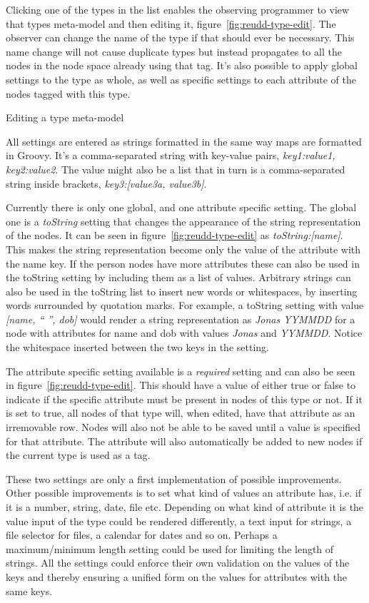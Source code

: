\documentclass[a4paper]{report}
\begin{document}
Clicking one of the types in the list enables the observing programmer to view that types meta-model and then editing it, figure~\ref{fig:reudd-type-edit}. The observer can change the name of the type if that should ever be necessary. This name change will not cause duplicate types but instead propagates to all the nodes in the node space already using that tag. It's also possible to apply global settings to the type as whole, as well as specific settings to each attribute of the nodes tagged with this type.

	{Editing a type meta-model}

All settings are entered as strings formatted in the same way maps are formatted in Groovy. It's a comma-separated string with key-value pairs, \emph{key1:value1, key2:value2}. The value might also be a list that in turn is a comma-separated string inside brackets, \emph{key3:[value3a, value3b]}.

Currently there is only one global, and one attribute specific setting. The global one is a \emph{toString} setting that changes the appearance of the string representation of the nodes. It can be seen in figure~\ref{fig:reudd-type-edit} as \emph{toString:[name]}. This makes the string representation become only the value of the attribute with the name key. If the person nodes have more attributes these can also be used in the toString setting by including them as a list of values. Arbitrary strings can also be used in the toString list to insert new words or whitespaces, by inserting words surrounded by quotation marks. For example, a toString setting with value \emph{[name, `` '', dob]} would render a string representation as \emph{Jonas YYMMDD} for a node with attributes for name and dob with values \emph{Jonas} and \emph{YYMMDD}. Notice the whitespace inserted between the two keys in the setting.

The attribute specific setting available is a \emph{required} setting and can also be seen in figure~\ref{fig:reudd-type-edit}. This should have a value of either true or false to indicate if the specific attribute must be present in nodes of this type or not. If it is set to true, all nodes of that type will, when edited, have that attribute as an irremovable row. Nodes will also not be able to be saved until a value is specified for that attribute. The attribute will also automatically be added to new nodes if the current type is used as a tag.

These two settings are only a first implementation of possible improvements. Other possible improvements is to set what kind of values an attribute has, i.e. if it is a number, string, date, file etc. Depending on what kind of attribute it is the value input of the type could be rendered differently, a text input for strings, a file selector for files, a calendar for dates and so on. Perhaps a maximum/minimum length setting could be used for limiting the length of strings. All the settings could enforce their own validation on the values of the keys and thereby ensuring a unified form on the values for attributes with the same keys.
\end{document}
